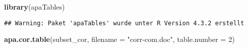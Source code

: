 \documentclass[
]{article}
\newenvironment{Shaded}{\begin{snugshade}}{\end{snugshade}}
\newcommand{\AttributeTok}[1]{\textcolor[rgb]{0.13,0.29,0.53}{#1}}
\newcommand{\DecValTok}[1]{\textcolor[rgb]{0.00,0.00,0.81}{#1}}
\newcommand{\FunctionTok}[1]{\textcolor[rgb]{0.13,0.29,0.53}{\textbf{#1}}}
\newcommand{\NormalTok}[1]{#1}
\newcommand{\StringTok}[1]{\textcolor[rgb]{0.31,0.60,0.02}{#1}}
\begin{document}
\begin{Shaded}
\begin{Highlighting}[]
\FunctionTok{library}\NormalTok{(apaTables)}
\end{Highlighting}
\end{Shaded}

\begin{verbatim}
## Warning: Paket 'apaTables' wurde unter R Version 4.3.2 erstellt
\end{verbatim}

\begin{Shaded}
\begin{Highlighting}[]
\FunctionTok{apa.cor.table}\NormalTok{(subset\_cor, }\AttributeTok{filename =} \StringTok{"corr{-}com.doc"}\NormalTok{, }\AttributeTok{table.number =} \DecValTok{2}\NormalTok{)}
\end{Highlighting}
\end{Shaded}
\end{document}
